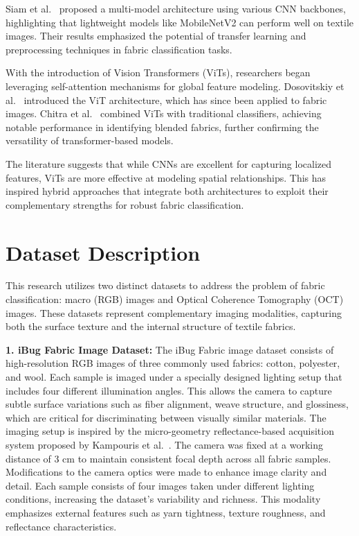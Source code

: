 Siam et al.~\cite{siam2021textilenet} proposed a multi-model architecture using various CNN backbones, highlighting that lightweight models like MobileNetV2 can perform well on textile images. Their results emphasized the potential of transfer learning and preprocessing techniques in fabric classification tasks.

With the introduction of Vision Transformers (ViTs), researchers began leveraging self-attention mechanisms for global feature modeling. Dosovitskiy et al.~\cite{dosovitskiy2020vit} introduced the ViT architecture, which has since been applied to fabric images. Chitra et al.~\cite{chitra2022vit} combined ViTs with traditional classifiers, achieving notable performance in identifying blended fabrics, further confirming the versatility of transformer-based models.

The literature suggests that while CNNs are excellent for capturing localized features, ViTs are more effective at modeling spatial relationships. This has inspired hybrid approaches that integrate both architectures to exploit their complementary strengths for robust fabric classification.

\section*{Dataset Description}

This research utilizes two distinct datasets to address the problem of fabric classification: macro (RGB) images and Optical Coherence Tomography (OCT) images. These datasets represent complementary imaging modalities, capturing both the surface texture and the internal structure of textile fabrics.

\textbf{1. iBug Fabric Image Dataset:}  
The iBug Fabric image dataset consists of high-resolution RGB images of three commonly used fabrics: cotton, polyester, and wool. Each sample is imaged under a specially designed lighting setup that includes four different illumination angles. This allows the camera to capture subtle surface variations such as fiber alignment, weave structure, and glossiness, which are critical for discriminating between visually similar materials. The imaging setup is inspired by the micro-geometry reflectance-based acquisition system proposed by Kampouris et al.~\cite{kampouris2022microgeometry}. The camera was fixed at a working distance of 3 cm to maintain consistent focal depth across all fabric samples. Modifications to the camera optics were made to enhance image clarity and detail. Each sample consists of four images taken under different lighting conditions, increasing the dataset's variability and richness. This modality emphasizes external features such as yarn tightness, texture roughness, and reflectance characteristics.

